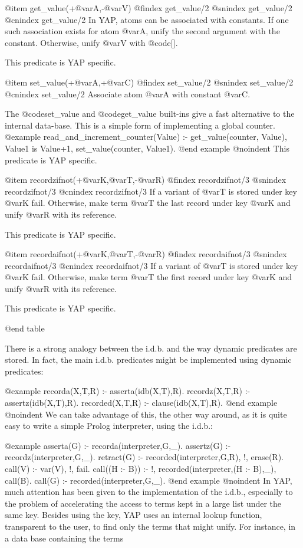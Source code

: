 {{{{{{@item get_value(+@var{A},-@var{V})
@findex get_value/2
@snindex get_value/2
@cnindex get_value/2
In YAP, atoms can be associated with constants. If one such
association exists for atom @var{A}, unify the second argument with the
constant. Otherwise, unify @var{V} with @code{[]}.

This predicate is YAP specific.

@item set_value(+@var{A},+@var{C})
@findex set_value/2 
@snindex set_value/2 
@cnindex set_value/2 
Associate atom @var{A} with constant @var{C}.

The @code{set_value} and @code{get_value} built-ins give a fast alternative to
the internal data-base. This is a simple form of implementing a global
counter.
@example
       read_and_increment_counter(Value) :-
                get_value(counter, Value),
                Value1 is Value+1,
                set_value(counter, Value1).
@end example
@noindent
This predicate is YAP specific.

@item recordzifnot(+@var{K},@var{T},-@var{R})
@findex recordzifnot/3
@snindex recordzifnot/3
@cnindex recordzifnot/3
If a variant of @var{T} is stored under key @var{K} fail. Otherwise, make
term @var{T} the last record under key @var{K} and unify @var{R} with its
reference.

This predicate is YAP specific.

@item recordaifnot(+@var{K},@var{T},-@var{R})
@findex recordaifnot/3
@snindex recordaifnot/3
@cnindex recordaifnot/3
If a variant of @var{T} is stored under key @var{K} fail. Otherwise, make
term @var{T} the first record under key @var{K} and unify @var{R} with its
reference.

This predicate is YAP specific.

@end table

There is a strong analogy between the i.d.b. and the way dynamic 
predicates are stored. In fact, the main i.d.b. predicates might be 
implemented using dynamic predicates:

@example
recorda(X,T,R) :- asserta(idb(X,T),R).
recordz(X,T,R) :- assertz(idb(X,T),R).
recorded(X,T,R) :- clause(idb(X,T),R).
@end example
@noindent
 We can take advantage of this, the other way around, as it is quite 
easy to write a simple Prolog interpreter, using the i.d.b.:

@example
asserta(G) :- recorda(interpreter,G,_).
assertz(G) :- recordz(interpreter,G,_).
retract(G) :- recorded(interpreter,G,R), !, erase(R).
call(V) :- var(V), !, fail.
call((H :- B)) :- !, recorded(interpreter,(H :- B),_), call(B).
call(G) :- recorded(interpreter,G,_).
@end example
@noindent
In YAP, much attention has been given to the implementation of the 
i.d.b., especially to the problem of accelerating the access to terms kept in 
a large list under the same key. Besides using the key, YAP uses an internal 
lookup function, transparent to the user, to find only the terms that might 
unify. For instance, in a data base containing the terms

}}}}}}
